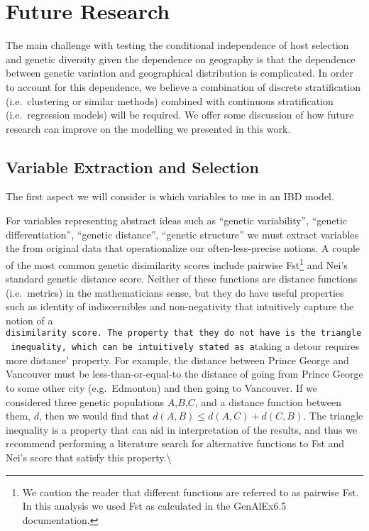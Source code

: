 \documentclass[
  letterpaper,
  DIV=11,
  numbers=noendperiod]{scrreprt}
\begin{document}
\section{Future Research}\label{future-research}

The main challenge with testing the conditional independence of host
selection and genetic diversity given the dependence on geography is
that the dependence between genetic variation and geographical
distribution is complicated. In order to account for this dependence, we
believe a combination of discrete stratification (i.e.~clustering or
similar methods) combined with continuous stratification
(i.e.~regression models) will be required. We offer some discussion of
how future research can improve on the modelling we presented in this
work.

\subsection{Variable Extraction and
Selection}\label{variable-extraction-and-selection}

The first aspect we will consider is which variables to use in an IBD
model.

For variables representing abstract ideas such as ``genetic
variability'', ``genetic differentiation'', ``genetic distance'',
``genetic structure'' we must extract variables the from original data
that operationalize our often-less-precise notions. A couple of the most
common genetic disimilarity scores include pairwise
Fst\footnote{We caution the reader that different functions are referred to as pairwise Fst. In this analysis we used Fst as calculated in the GenAlEx6.5 documentation.}
and Nei's standard genetic distance score. Neither of these functions
are distance functions (i.e.~metrics) in the mathematicians sense, but
they do have useful properties such as identity of indiscernibles and
non-negativity that intuitively capture the notion of a
\texttt{disimilarity\ score\textquotesingle{}.\ The\ property\ that\ they\ do\ not\ have\ is\ the\ triangle\ inequality,\ which\ can\ be\ intuitively\ stated\ as\ a}taking
a detour requires more distance' property. For example, the distance
between Prince George and Vancouver must be less-than-or-equal-to the
distance of going from Prince George to some other city (e.g.~Edmonton)
and then going to Vancouver. If we considered three genetic populations
\(A\),\(B\),\(C\), and a distance function between them, \(d\), then we
would find that \(d(A,B) \leq d(A,C) + d(C,B)\). The triangle inequality
is a property that can aid in interpretation of the results, and thus we
recommend performing a literature search for alternative functions to
Fst and Nei's score that satisfy this property.\textbackslash{}
\end{document}
